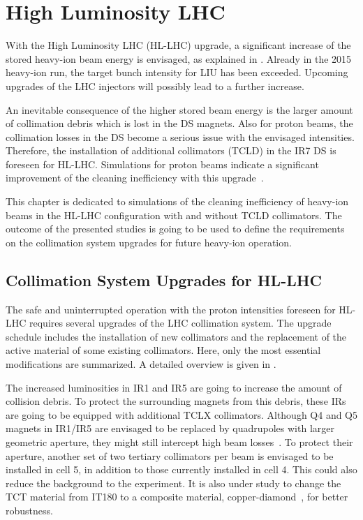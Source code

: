 \newpage

\section{High Luminosity LHC} \label{chap:hllhc}
%

With the High Luminosity LHC (HL-LHC) upgrade, a significant increase of the stored heavy-ion beam energy is envisaged, as explained in . Already in the 2015 heavy-ion run, the target bunch intensity for LIU has been exceeded. Upcoming upgrades of the LHC injectors will possibly lead to a further increase.

An inevitable consequence of the higher stored beam energy is the larger amount of collimation debris which is lost in the DS magnets.  Also for proton beams, the collimation losses in the DS become a serious issue with the envisaged intensities. Therefore, the installation of additional collimators (TCLD) in the IR7 DS is foreseen for HL-LHC. Simulations for proton beams indicate a significant improvement of the cleaning inefficiency with this upgrade~\cite{Bruce2014}. 

This chapter is dedicated to simulations of the cleaning inefficiency of heavy-ion beams in the HL-LHC configuration with and without TCLD collimators. The outcome of the presented studies is going to be used to define the requirements on the collimation system upgrades for future heavy-ion operation.

\subsection{Collimation System Upgrades for HL-LHC} \label{hl:coll}


The safe and uninterrupted operation with the proton intensities foreseen for HL-LHC requires several upgrades of the LHC collimation system. The upgrade schedule includes the installation of new collimators and the replacement of the active material of some existing collimators. Here, only the most essential modifications are summarized. A detailed overview is given in \cite{IPAC16:WEPMW030}. 


The increased luminosities in IR1 and IR5 are going to increase the amount of collision debris. To protect the surrounding magnets from this debris, these IRs are going to be equipped with additional TCLX collimators.  Although Q4 and Q5 magnets in IR1/IR5 are envisaged to be replaced by quadrupoles with larger geometric aperture, they might still intercept high beam losses~\cite{IPAC15:TUPTY066}. To protect their aperture, another set of two tertiary collimators per beam is envisaged to be installed in cell 5, in addition to those currently installed in cell 4. This could also reduce the background to the experiment. It is also under study to change the TCT material from IT180 to a composite material, copper-diamond~\cite{IPAC16:WEPMW031}, for better robustness. 

